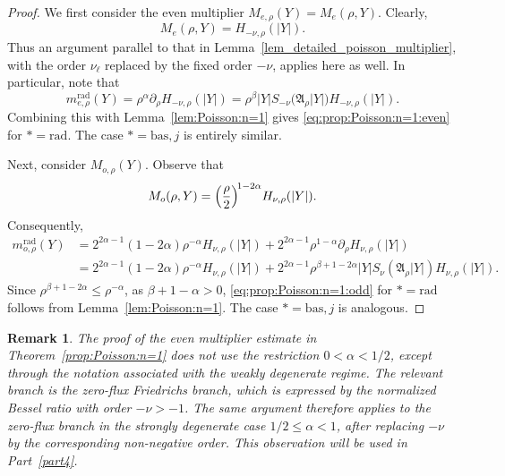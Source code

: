 \documentclass[12pt]{amsart}
\newtheorem{remark}[theorem]{Remark}
\begin{document}
\begin{proof}
We first consider the even multiplier $M_{e,\rho}(Y) = M_{e}(\rho,Y)$. Clearly,
\begin{equation*}
    M_e(\rho,Y) = H_{-\nu,\rho}(|Y|).
\end{equation*}
Thus an argument parallel to that in Lemma~\ref{lem_detailed_poisson_multiplier}, with the order $\nu_\ell$ replaced by the fixed order $-\nu$, applies here as well. In particular, note that
\begin{equation*}
    m_{e,\rho}^{\mathrm{rad}}(Y) = \rho^\alpha \partial_\rho H_{-\nu,\rho}(|Y|) = \rho^\beta |Y| S_{-\nu}\bigl(\mathfrak A_\rho |Y| \bigr) H_{-\nu,\rho}(|Y|).
\end{equation*}
Combining this with Lemma~\ref{lem:Poisson:n=1} gives \eqref{eq:prop:Poisson:n=1:even} for $*=\mathrm{rad}$. The case $*=\mathrm{bas},j$ is entirely similar.

Next, consider $M_{o,\rho}(Y)$. Observe that
\begin{equation*}
    M_{o}(\rho,Y) = \Bigl(\frac{\rho}{2}\Bigr)^{\!1-2\alpha} H_{\nu,\rho}(|Y|).
\end{equation*}
Consequently,
\begin{align*}
    m_{o,\rho}^{\mathrm{rad}}(Y) &= 2^{2\alpha-1}(1-2\alpha) \rho^{-\alpha} H_{\nu,\rho}(|Y|) + 2^{2\alpha-1} \rho^{1-\alpha} \partial_\rho H_{\nu,\rho}(|Y|)\\
    &= 2^{2\alpha-1}(1-2\alpha) \rho^{-\alpha} H_{\nu,\rho}(|Y|) + 2^{2\alpha-1} \rho^{\beta+1-2\alpha} |Y| S_{\nu}(\mathfrak A_\rho |Y|) H_{\nu,\rho}(|Y|).
\end{align*}
Since $\rho^{\beta+1-2\alpha}\le \rho^{-\alpha}$, as $\beta+1-\alpha >0$, \eqref{eq:prop:Poisson:n=1:odd} for $*=\mathrm{rad}$ follows from Lemma~\ref{lem:Poisson:n=1}. The case $*=\mathrm{bas},j$ is analogous.
\end{proof}

\begin{remark}\label{re:even:Poisson}
The proof of the even multiplier estimate in Theorem~\ref{prop:Poisson:n=1} does not use the restriction $0<\alpha<1/2$, except through the notation associated with the weakly degenerate regime. The relevant branch is the zero-flux Friedrichs branch, which is expressed by the normalized Bessel ratio with order $-\nu>-1$. The same argument therefore applies to the zero-flux branch in the strongly degenerate case $1/2\leq\alpha<1$, after replacing $-\nu$ by the corresponding non-negative order. This observation will be used in Part~\ref{part4}.
\end{remark}
\end{document}
